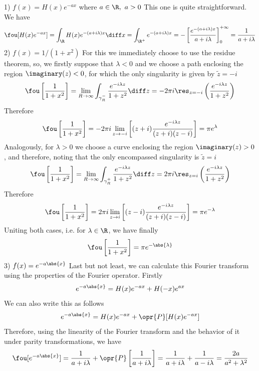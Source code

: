 \documentclass[../mmf.tex]{subfiles}
\begin{document}
\begin{eg}
	1) $f(x)=H(x)e^{-ax}$ where $a\in\R,\ a>0$
	This one is quite straightforward. We have
	\begin{equation*}
		\fou[H(x)e^{-ax}]=\int_{\R}^{}H(x)e^{-(a+i\lambda)x}\diff x=\int_{\R^+}e^{-(a+i\lambda)x}=-\left[ \frac{e^{-(a+i\lambda)x}}{a+i\lambda} \right]_0^{+\infty}=\frac{1}{a+i\lambda}
	\end{equation*}
	2) $f(x)=1/(1+x^2)$
	For this we immediately choose to use the residue theorem, so, we firstly suppose that $\lambda<0$ and we choose a path enclosing the region $\imaginary(z)<0$, for which the only singularity is given by $\tilde{z}=-i$
	\begin{equation*}
		\fou\left[ \frac{1}{1+x^2} \right]=\lim_{R\to\infty}\int_{\gamma_R^-}^{}\frac{e^{-i\lambda z}}{1+z^2}\diff z=-2\pi i\res_{z=-i}\left( \frac{e^{-i\lambda z}}{1+z^2} \right)
	\end{equation*}
	Therefore
	\begin{equation*}
		\fou\left[ \frac{1}{1+x^2} \right]=-2\pi i\lim_{z\to-i}\left[ (z+i)\frac{e^{-i\lambda z}}{(z+i)(z-i)} \right]=\pi e^\lambda
	\end{equation*}
	Analogously, for $\lambda>0$ we choose a curve enclosing the region $\imaginary(z)>0$, and therefore, noting that the only encompassed singularity is $\tilde{z}=i$
	\begin{equation*}
		\fou\left[ \frac{1}{1+x^2} \right]=\lim_{R\to\infty}\int_{\gamma^+_R}^{}\frac{e^{-i\lambda z}}{1+z^2}\diff z=2\pi i\res_{z=i}\left( \frac{e^{-i\lambda z}}{1+z^2} \right)
	\end{equation*}
	Therefore
	\begin{equation*}
		\fou\left[ \frac{1}{1+x^2} \right]=2\pi i\lim_{z\to i}\left[ (z-i)\frac{e^{-i\lambda z}}{(z+i)(z-i)} \right]=\pi e^{-\lambda}
	\end{equation*}
	Uniting both cases, i.e. for $\lambda\in\R$, we have finally
	\begin{equation*}
		\fou\left[ \frac{1}{1+x^2} \right]=\pi e^{-\abs{\lambda}}
	\end{equation*}
	3) $f(x)=e^{-a\abs{x}}$
	Last but not least, we can calculate this Fourier transform using the properties of the Fourier operator. Firstly
	\begin{equation*}
		e^{-a\abs{x}}=H(x)e^{-ax}+H(-x)e^{ax}
	\end{equation*}
	We can also write this as follows
	\begin{equation*}
		e^{-a\abs{x}}=H(x)e^{-ax}+\opr{P}[H(x)e^{-ax}]
	\end{equation*}
	Therefore, using the linearity of the Fourier transform and the behavior of it under parity transformations, we have
	\begin{equation*}
		\fou[e^{-a\abs{x}}]=\frac{1}{a+i\lambda}+\opr{P}\left[ \frac{1}{a+i\lambda} \right]=\frac{1}{a+i\lambda}+\frac{1}{a-i\lambda}=\frac{2a}{a^2+\lambda^2}
	\end{equation*}
\end{eg}
\end{document}
